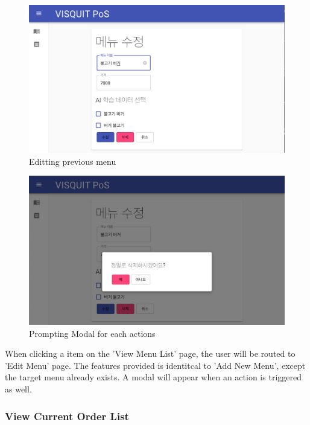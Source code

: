 \documentclass[conference,compsoc]{IEEEtran}
\begin{document}
\begin{figure}[h!]
  \includegraphics[width=\linewidth]{figures/frontend/06-editmenu-landing.png}
  \caption{Editting previous menu}
  \label{fig:06-editmenu-landing}
\end{figure}
\begin{figure}[h!]
  \includegraphics[width=\linewidth]{figures/frontend/07-editmenu-modal.png}
  \caption{Prompting Modal for each actions}
  \label{fig:07-editmenu-modal}
\end{figure}

When clicking a item on the 'View Menu List' page, the user will be routed to 'Edit Menu' page. The features provided is identitcal to 'Add New Menu', except the target menu already exists. A modal will appear when an action is triggered as well.

\subsubsection{View Current Order List}
\end{document}
